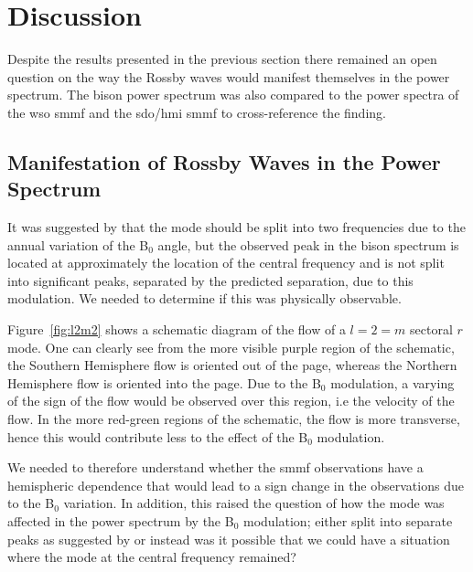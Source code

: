 \section{Discussion}\label{sec:r-mode_discussion}


Despite the results presented in the previous section there remained an open question on the way the Rossby waves would manifest themselves in the power spectrum. The \gls{bison} power spectrum was also compared to the power spectra of the \gls{wso} \gls{smmf} and the \gls{sdo/hmi} \gls{smmf} to cross-reference the finding.

\subsection{Manifestation of Rossby Waves in the Power Spectrum}

It was suggested by \citet{lanza_sectoral_2019} that the mode should be split into two frequencies due to the annual variation of the B$_0$ angle, but the observed peak in the \gls{bison} spectrum is located at approximately the location of the central frequency and is not split into significant peaks, separated by the predicted separation, due to this modulation. We needed to determine if this was physically observable.

Figure~\ref{fig:l2m2} shows a schematic diagram of the flow of a $l=2=m$ sectoral $r$ mode. One can clearly see from the more visible purple region of the schematic, the Southern Hemisphere flow is oriented out of the page, whereas the Northern Hemisphere flow is oriented into the page. Due to the B$_0$ modulation, a varying of the sign of the flow would be observed over this region, i.e the velocity of the flow. In the more red-green regions of the schematic, the flow is more transverse, hence this would contribute less to the effect of the B$_0$ modulation.

We needed to therefore understand whether the \gls{smmf} observations have a hemispheric dependence that would lead to a sign change in the observations due to the B$_0$ variation. In addition, this raised the question of how the mode was affected in the power spectrum by the B$_0$ modulation; either split into separate peaks as suggested by \citet{lanza_sectoral_2019} or instead was it possible that we could have a situation where the mode at the central frequency remained?

